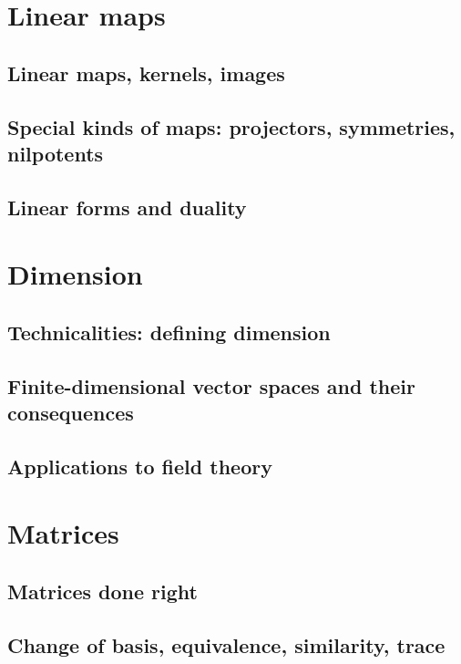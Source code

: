 \documentclass{book}
\theoremstyle{plain}
\theoremstyle{definition}
\theoremstyle{remark}
\begin{document}
\chapter{Linear maps}

\section{Linear maps, kernels, images}

\section{Special kinds of maps: projectors, symmetries, nilpotents}

\section{Linear forms and duality}

\chapter{Dimension}

\section{Technicalities: defining dimension}

\section{Finite-dimensional vector spaces and their consequences}

\section{Applications to field theory}


\chapter{Matrices}

\section{Matrices done right}

\section{Change of basis, equivalence, similarity, trace}
\end{document}
